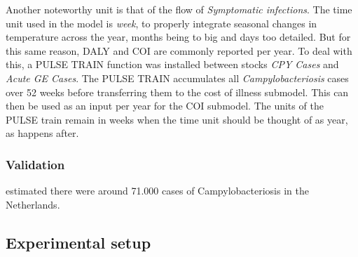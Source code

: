 Another noteworthy unit is that of the flow of \textit{Symptomatic infections}. The time unit used in the model is \textit{week}, to properly integrate seasonal changes in temperature across the year, months being to big and days too detailed. But for this same reason, DALY and COI are commonly reported per year. To deal with this, a PULSE TRAIN function was installed between stocks \textit{CPY Cases} and \textit{Acute GE Cases}. The PULSE TRAIN accumulates all \textit{Campylobacteriosis} cases over 52 weeks before transferring them to the cost of illness submodel. This can then be used as an input per year for the COI submodel. The units of the PULSE train remain in weeks when the time unit should be thought of as year, as happens after. 

    
\subsubsection{Validation}    

\cite{vlaanderen_staat_2019} estimated there were around 71.000 cases of Campylobacteriosis in the Netherlands.

\parencite{nepluvi_rapportage_2019}

    
\subsection{Experimental setup}

